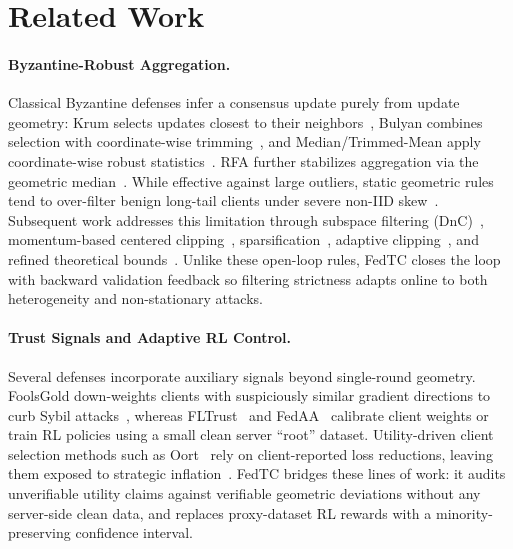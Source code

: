 \section{Related Work}
\label{sec:related_work}

\paragraph{Byzantine-Robust Aggregation.}
Classical Byzantine defenses infer a consensus update purely from update geometry: Krum selects updates closest to their neighbors~\cite{blanchard2017machine}, Bulyan combines selection with coordinate-wise trimming~\cite{guerraoui2018hidden}, and Median/Trimmed-Mean apply coordinate-wise robust statistics~\cite{yin2018byzantine}. RFA further stabilizes aggregation via the geometric median~\cite{pillutla2022robust}. While effective against large outliers, static geometric rules tend to over-filter benign long-tail clients under severe non-IID skew~\cite{peng2024mean}. Subsequent work addresses this limitation through subspace filtering (DnC)~\cite{shejwalkar2021manipulating}, momentum-based centered clipping~\cite{karimireddy2021learning}, sparsification~\cite{panda2022sparsefed}, adaptive clipping~\cite{allouah2024adaptive}, and refined theoretical bounds~\cite{zhu2023byzantine,mai2024rflpa}. Unlike these open-loop rules, FedTC closes the loop with backward validation feedback so filtering strictness adapts online to both heterogeneity and non-stationary attacks.

\paragraph{Trust Signals and Adaptive RL Control.}
Several defenses incorporate auxiliary signals beyond single-round geometry. FoolsGold down-weights clients with suspiciously similar gradient directions to curb Sybil attacks~\cite{fung2018mitigating}, whereas FLTrust~\cite{cao2020fltrust} and FedAA~\cite{he2025fedaa} calibrate client weights or train RL policies using a small clean server ``root'' dataset. Utility-driven client selection methods such as Oort~\cite{lai2021oort,fu2022clientselection} rely on client-reported loss reductions, leaving them exposed to strategic inflation~\cite{gao2021fifl,xiong2023truthful,chakarov2024incentivizing}. FedTC bridges these lines of work: it audits unverifiable utility claims against verifiable geometric deviations without any server-side clean data, and replaces proxy-dataset RL rewards with a minority-preserving confidence interval.


